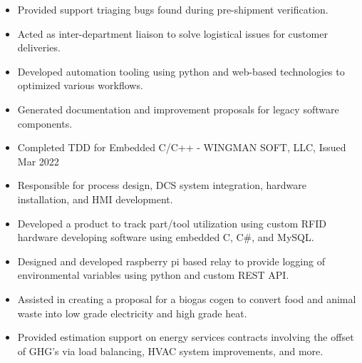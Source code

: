 \documentclass[a4paper,ragged2e,withhyper]{altacv}
\begin{document}
\begin{itemize}
\item Provided support triaging bugs found during pre-shipment verification.\\
\item Acted as inter-department liaison to solve logistical issues for customer deliveries.\\
\item Developed automation tooling using python and web-based technologies to optimized various workflows.\\
\item Generated documentation and improvement proposals for legacy software components.\\
\item Completed TDD for Embedded C/C++ - WINGMAN SOFT, LLC, Issued Mar 2022\\
\end{itemize}

\divider


\begin{itemize}
\item Responsible for process design, DCS system integration, hardware installation, and HMI development.\\
\item Developed a product to track part/tool utilization using custom RFID hardware developing software using embedded C, C\#, and MySQL.\\
\end{itemize}

\divider


\begin{itemize}
\item Designed and developed raspberry pi based relay to provide logging of environmental variables using python and custom REST API.\\
\item Assisted in creating a proposal for a biogas cogen to convert food and animal waste into low grade electricity and high grade heat.\\
\item Provided estimation support on energy services contracts involving the offset of GHG's via load balancing, HVAC system improvements, and more.\\
\end{itemize}
\end{document}
